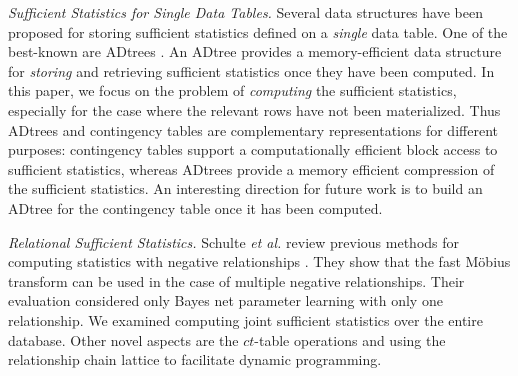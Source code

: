 \documentclass{sig-alternate-2013}
\newcommand{\ct}{\mathit{ct}}
\begin{document}
{\em Sufficient Statistics for Single Data Tables.} Several data structures have been proposed for storing sufficient statistics defined on a {\em single} data table. 
One of the best-known are ADtrees \cite{Moore1998}. 
An ADtree provides a memory-efficient data structure for {\em storing} and retrieving sufficient statistics once they have been computed. 
In this paper, we focus on the problem of {\em computing} the sufficient statistics, especially for the case where the relevant rows have not been materialized. 
Thus ADtrees and contingency tables are complementary representations for different purposes: contingency tables support a computationally efficient block access to sufficient statistics, whereas ADtrees provide a memory efficient compression of the sufficient statistics. 
An interesting direction for future work is to build an ADtree for the contingency table once it has been computed. 


{\em Relational Sufficient Statistics.} 
%
Schulte {\em et al.} review previous methods for computing statistics with negative relationships \cite{Schulte2014}. They show that the fast M\"obius transform can be used in the case of multiple negative relationships. 
Their evaluation considered only Bayes net parameter learning with only one relationship. 
We examined computing joint sufficient statistics over the entire database. 
Other novel aspects are the $\ct$-table operations and using the relationship chain lattice to facilitate dynamic programming. 
\end{document}
